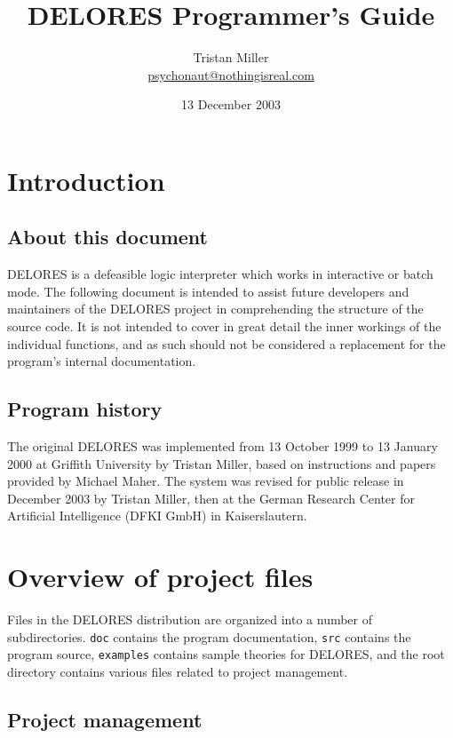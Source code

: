 \documentclass[a4paper,10pt,twocolumn]{article}
\begin{document}
\title{DELORES Programmer's Guide}
\author{Tristan Miller\\
\url{psychonaut@nothingisreal.com}}
\date{13 December 2003}
\maketitle
\tableofcontents

\section{Introduction}
\subsection{About this document}

DELORES is a defeasible logic interpreter which works in interactive
or batch mode. The following document is intended to assist future
developers and maintainers of the DELORES project in comprehending the
structure of the source code. It is not intended to cover in great
detail the inner workings of the individual functions, and as such
should not be considered a replacement for the program's internal
documentation.

\subsection{Program history}

The original DELORES was implemented from 13 October 1999 to 13
January 2000 at Griffith University by Tristan Miller, based on
instructions and papers provided by Michael Maher. The system was
revised for public release in December 2003 by Tristan Miller, then at
the German Research Center for Artificial Intelligence (DFKI GmbH) in
Kaisers\-lautern.

\section{Overview of project files}

Files in the DELORES distribution are organized into a number of
subdirectories.  \texttt{doc} contains the program documentation,
\texttt{src} contains the program source, \texttt{examples} contains
sample theories for DELORES, and the root directory contains various
files related to project management.

\subsection{Project management}
\end{document}

